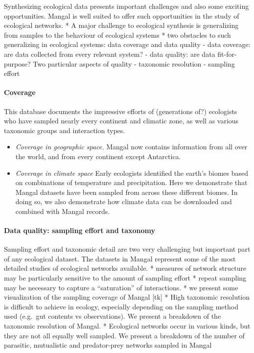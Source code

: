 Synthesizing ecological data presents important challenges and also some
exciting opportunities. Mangal is well suited to offer such
opportunities in the study of ecological networks. * A major challenge
to ecological synthesis is generalizing from samples to the behaviour of
ecological systems * two obstacles to such generalizing in ecological
systems: data coverage and data quality - data coverage: are data
collected from every relevant system? - data quality: are data
fit-for-purpose? Two particular aspects of quality - taxonomic
resolution - sampling effort

\hypertarget{coverage}{%
\paragraph{Coverage}\label{coverage}}

This database documents the impressive efforts of (generations of?)
ecologists who have sampled nearly every continent and climatic zone, as
well as various taxonomic groups and interaction types.

\begin{itemize}
\tightlist
\item
  \emph{Coverage in geographic space.} Mangal now contains information
  from all over the world, and from every continent except Antarctica. 
\item
  \emph{Coverage in climate space} Early ecologists identified the
  earth's biomes based on combinations of temperature and precipitation.
  Here we demonstrate that Mangal datasets have been sampled from across
  these different biomes. In doing so, we also demonstrate how climate
  data can be downloaded and combined with Mangal records. 
\end{itemize}

\hypertarget{data-quality-sampling-effort-and-taxonomy}{%
\paragraph{Data quality: sampling effort and
taxonomy}\label{data-quality-sampling-effort-and-taxonomy}}

Sampling effort and taxonomic detail are two very challenging but
important part of any ecological dataset. The datasets in Mangal
represent some of the most detailed studies of ecological networks
available. * measures of network structure may be particularly sensitive
to the amount of sampling effort * repeat sampling may be necessary to
capture a ``saturation'' of interactions. * we present some
visualization of the sampling coverage of Mangal {[}tk{]} * High
taxonomic resolution is difficult to achieve in ecology, especially
depending on the sampling method used (e.g.~gut contents vs
observations). We present a breakdown of the taxonomic resolution of
Mangal. * Ecological networks occur in various kinds, but they are not
all equally well sampled. We present a breakdown of the number of
parasitic, mutualistic and predator-prey networks sampled in Mangal

